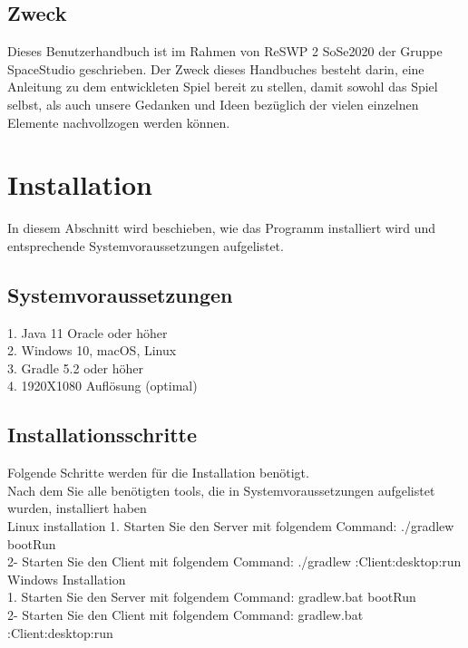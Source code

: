 \documentclass[fontsize=12pt,paper=a4,twoside]{scrartcl}
\begin{document}
\subsection{Zweck}

Dieses Benutzerhandbuch ist im Rahmen von ReSWP 2 SoSe2020  der Gruppe SpaceStudio geschrieben.
Der Zweck dieses Handbuches besteht darin, eine Anleitung zu dem entwickleten Spiel bereit zu stellen, damit sowohl das Spiel selbst, als auch unsere Gedanken und Ideen bezüglich der vielen einzelnen Elemente nachvollzogen werden können.


\section{Installation}
In diesem Abschnitt wird beschieben, wie das Programm installiert wird und entsprechende Systemvoraussetzungen aufgelistet.

\subsection{Systemvoraussetzungen}
1. Java 11 Oracle oder höher \\
2. Windows 10, macOS, Linux \\
3. Gradle 5.2 oder höher \\
4. 1920X1080 Auflösung (optimal)
 

\subsection{Installationsschritte}
Folgende  Schritte werden für die Installation benötigt. \\
 Nach dem Sie alle benötigten tools, die in Systemvoraussetzungen aufgelistet wurden, installiert haben \\
Linux installation
1. Starten Sie den Server mit folgendem Command: ./gradlew bootRun\\
2- Starten Sie den Client mit folgendem Command:  ./gradlew :Client:desktop:run \\

Windows Installation \\

1. Starten Sie den Server mit folgendem Command: gradlew.bat bootRun\\
2- Starten Sie den Client mit folgendem Command:  gradlew.bat :Client:desktop:run \\
\end{document}
